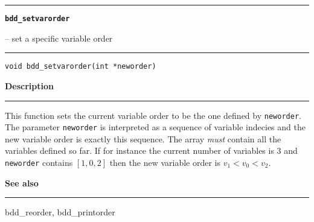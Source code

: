 \begin{minipage}{\textwidth}

\noindent\begin{minipage}{\textwidth}
\rule{\textwidth}{0.5mm}
{\tt\bf bdd\_setvarorder }
\--- set a specific variable order  \hspace{\fill}
\\\rule[1.5ex]{\textwidth}{0.5mm}
\end{minipage}

\noindent\begin{verbatim}
void bdd_setvarorder(int *neworder) 
\end{verbatim}

\vspace{\parsep}\noindent
{\bf Description}\\\rule[1.5ex]{\textwidth}{0.2mm}\vspace{-1.5ex}\setlength{\parindent}{1em}
This function sets the current variable order to be the one
           defined by {\tt neworder}. The parameter {\tt neworder} is
	   interpreted as a sequence of variable indecies and the new
	   variable order is exactly this sequence. The array {\em must}
	   contain all the variables defined so far. If for instance the
	   current number of variables is 3 and {\tt neworder} contains
	   $[1,0,2]$ then the new variable order is $v_1 < v_0 < v_2$. 

\vspace{\parsep}\vspace{\baselineskip}\noindent
{\bf See also}\\\rule[1.5ex]{\textwidth}{0.2mm}\vspace{-1.5ex}
bdd\_reorder, bdd\_printorder 
\end{minipage}
\vspace{8ex}
